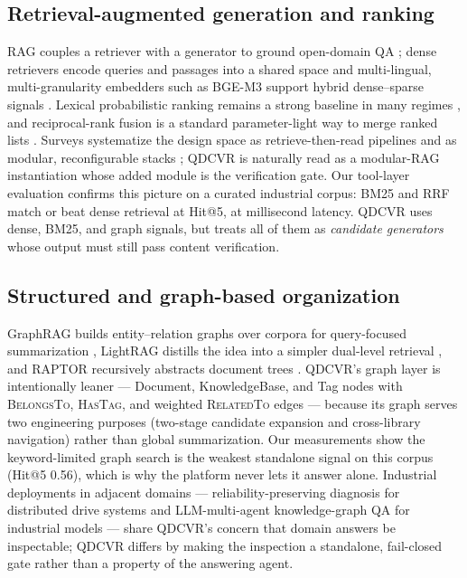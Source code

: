 \documentclass[preprint,12pt]{elsarticle}
\begin{document}
\subsection{Retrieval-augmented generation and ranking}
RAG couples a retriever with a generator to ground open-domain QA
\cite{rag-lewis}; dense retrievers encode queries and passages into a shared
space \cite{dpr} and multi-lingual, multi-granularity embedders such as
BGE-M3 support hybrid dense--sparse signals \cite{bge-m3}. Lexical
probabilistic ranking remains a strong baseline in many regimes \cite{bm25},
and reciprocal-rank fusion is a standard parameter-light way to merge ranked
lists \cite{rrf-cormack}. Surveys systematize the design space as
retrieve-then-read pipelines \cite{gao-ragsurvey} and as modular,
reconfigurable stacks \cite{modular-rag}; QDCVR is naturally read as a
modular-RAG instantiation whose added module is the verification gate.
Our tool-layer evaluation confirms this picture on
a curated industrial corpus: BM25 and RRF match or beat dense retrieval at
Hit@5, at millisecond latency. QDCVR uses dense, BM25, and graph signals, but
treats all of them as \emph{candidate generators} whose output must still
pass content verification.

\subsection{Structured and graph-based organization}
GraphRAG builds entity--relation graphs over corpora for query-focused
summarization \cite{graphrag}, LightRAG distills the idea into a simpler
dual-level retrieval \cite{lightrag}, and RAPTOR recursively abstracts
document trees \cite{raptor}. QDCVR's graph layer is intentionally leaner ---
Document, KnowledgeBase, and Tag nodes with \textsc{BelongsTo},
\textsc{HasTag}, and weighted \textsc{RelatedTo} edges --- because its graph
serves two engineering purposes (two-stage candidate expansion and
cross-library navigation) rather than global summarization. Our measurements
show the keyword-limited graph search is the weakest standalone signal on
this corpus (Hit@5 0.56), which is why the platform never lets it answer
alone. Industrial deployments in adjacent domains --- reliability-preserving
diagnosis for distributed drive systems \cite{rrpdg} and LLM-multi-agent
knowledge-graph QA for industrial models \cite{comaikg} --- share QDCVR's
concern that domain answers be inspectable; QDCVR differs by making the
inspection a standalone, fail-closed gate rather than a property of the
answering agent.
\end{document}
